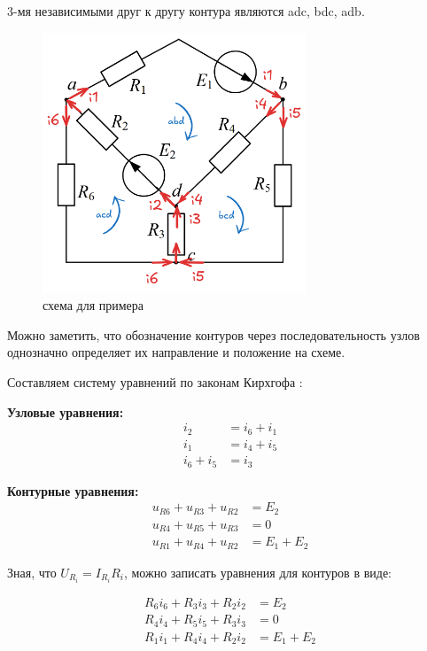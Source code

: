 3-мя независимыми друг к другу контура являются adc, bdc, adb.

\begin{figure}[H]
    \centering
    \includegraphics[width=0.7\textwidth]{images/Klaws_kontours_nodes.png}
    \caption{схема для примера}
    \label{fig:example}
\end{figure}

Можно заметить, что обозначение контуров через последовательность узлов однозначно определяет их направление и положение на схеме.


Составляем систему уравнений по законам Кирхгофа :



\textbf{Узловые уравнения:}
\begin{align}
    i_2 &= i_6 + i_1 \tag{a} \\
    i_1 &= i_4 + i_5 \tag{b} \\
    i_6 + i_5 &= i_3 \tag{c}
\end{align}

\textbf{Контурные уравнения:}
\begin{align}
    u_{R6} + u_{R3} + u_{R2} &= E_2 \tag{acd} \\
    u_{R4} + u_{R5} + u_{R3} &= 0 \tag{dbc} \\
    u_{R1} + u_{R4} + u_{R2} &= E_1 + E_2 \tag{abd}
\end{align}

Зная, что $U_{R_i}= I_{R_i} R_i$, можно записать уравнения для контуров в виде:

\begin{align}
    R_6 i_6 + R_3 i_3 + R_2 i_2 &= E_2 \tag{acd} \\
    R_4 i_4 + R_5 i_5 + R_3 i_3 &= 0 \tag{dbc} \\
    R_1 i_1 + R_4 i_4 + R_2 i_2 &= E_1 + E_2 \tag{abd}
\end{align}


